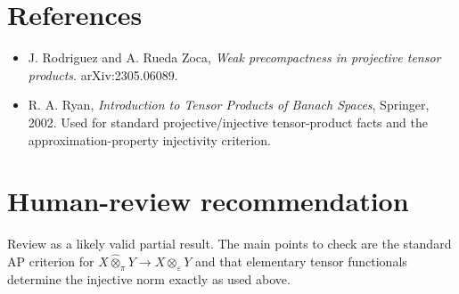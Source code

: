 \documentclass[11pt]{article}
\newcommand{\pten}{\widehat{\otimes}_{\pi}}
\newcommand{\eten}{\widehat{\otimes}_{\varepsilon}}
\begin{document}
\section*{References}

\begin{itemize}
\item J. Rodriguez and A. Rueda Zoca, \emph{Weak precompactness in projective tensor products}.  arXiv:2305.06089.
\item R. A. Ryan, \emph{Introduction to Tensor Products of Banach Spaces}, Springer, 2002.  Used for standard projective/injective tensor-product facts and the approximation-property injectivity criterion.
\end{itemize}

\section*{Human-review recommendation}

Review as a likely valid partial result.  The main points to check are the standard AP criterion for \(X\pten Y\to X\eten Y\) and that elementary tensor functionals determine the injective norm exactly as used above.
\end{document}
